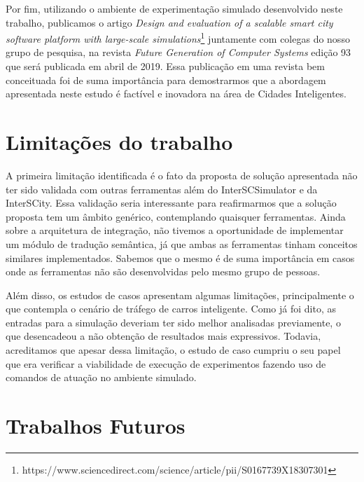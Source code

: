 Por fim, utilizando o ambiente de experimentação simulado desenvolvido neste trabalho, publicamos o artigo \textit{Design and evaluation of a scalable smart city software platform with
large-scale simulations}\footnote{https://www.sciencedirect.com/science/article/pii/S0167739X18307301} juntamente com colegas do nosso grupo de pesquisa, na revista \textit{Future Generation of
Computer Systems} edição 93 que será publicada em abril de 2019.  
Essa publicação em uma revista bem conceituada foi de suma importância para demostrarmos que a abordagem apresentada neste estudo é factível e inovadora na área de Cidades Inteligentes.


\section{Limitações do trabalho}


A primeira limitação identificada é o fato da proposta de solução apresentada não ter sido validada com outras ferramentas além do InterSCSimulator e da InterSCity.
Essa validação seria interessante para reafirmarmos que a solução proposta tem um âmbito genérico, contemplando quaisquer ferramentas.
Ainda sobre a arquitetura de integração, não tivemos a oportunidade de implementar um módulo de tradução semântica, já que ambas as ferramentas tinham conceitos similares implementados.
Sabemos que o mesmo é de suma importância em casos onde as ferramentas não são desenvolvidas pelo mesmo grupo de pessoas.

Além disso, os estudos de casos apresentam algumas limitações, principalmente o que contempla o cenário de tráfego de carros inteligente.
Como já foi dito, as entradas para a simulação deveriam ter sido melhor analisadas previamente, o que desencadeou a não obtenção de resultados mais expressivos.
Todavia, acreditamos que apesar dessa limitação, o estudo de caso cumpriu o seu papel que era verificar a viabilidade de execução de experimentos fazendo uso de comandos de atuação no
ambiente simulado.

\section{Trabalhos Futuros}

%
%

